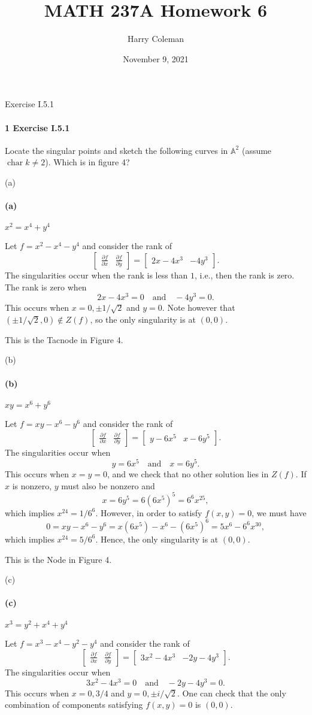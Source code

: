 \documentclass[12pt]{article}
\renewcommand{\maketitle}{\thispagestyle{title}}
\newlength{\myparskip}
\newenvironment{fullbox}{\begin{lrbox}{\savefullbox}\begin{minipage}{\dimexpr\textwidth-2\fboxsep\relax}\setlength{\parskip}{\myparskip}}{\end{minipage}\end{lrbox}\framebox[\textwidth]{\usebox{\savefullbox}}}
\newenvironment{pbox}[1][]{\begin{fullbox}\ifx#1\empty\else\paragraph{#1}\fi}{\end{fullbox}}
\newcommand{\isp}[1]{\quad\text{#1}\quad}
\newcommand{\<}{\langle}
\renewcommand{\>}{\rangle}
\newcommand{\A}{\mathbb{A}}
\newcommand{\mat}[1]{\begin{bmatrix}#1\end{bmatrix}}
\newcommand{\pdv}[2]{\frac{\partial #1}{\partial #2}}
\begin{document}
\title{MATH 237A Homework 6}
\author{Harry Coleman}
\date{November 9, 2021}
\maketitle

\begin{pbox}[1 Exercise I.5.1]
    Locate the singular points and sketch the following curves in $\A^2$ (assume $\operatorname{char} k \ne 2$). Which is in figure 4?
\end{pbox}

\begin{pbox}[(a)]
    $x^2 = x^4 + y^4$
\end{pbox}

Let $f = x^2 - x^4 - y^4$ and consider the rank of
\[
    \mat{\pdv{f}{x} & \pdv{f}{y}} = \mat{2x - 4x^3 & -4y^3}.
\]
The singularities occur when the rank is less than $1$, i.e., then the rank is zero. The rank is zero when
\[
    2x - 4x^3 = 0 \isp{and} -4y^3 = 0.
\]
This occurs when $x = 0, \pm1/\sqrt{2}$ and $y = 0$. Note however that $(\pm1/\sqrt{2}, 0) \notin Z(f)$, so the only singularity is at $(0, 0)$.

This is the Tacnode in Figure 4.

\begin{pbox}[(b)]
    $xy = x^6 + y^6$
\end{pbox}

Let $f = xy - x^6 - y^6$ and consider the rank of
\[
    \mat{\pdv{f}{x} & \pdv{f}{y}} = \mat{y - 6x^5 & x - 6y^5}.
\]
The singularities occur when
\[
    y = 6x^5 \isp{and} x = 6y^5.
\]
This occurs when $x = y = 0$, and we check that no other solution lies in $Z(f)$. If $x$ is nonzero, $y$ must also be nonzero and
\[
    x = 6y^5 = 6(6x^5)^5 = 6^6x^{25},
\]
which implies $x^{24} = 1/6^6$. However, in order to satisfy $f(x, y) = 0$, we must have
\[
    0 = xy - x^6 - y^6 = x(6x^5) - x^6 - (6x^5)^6 = 5x^6 - 6^6 x^{30},
\]
which implies $x^{24} = 5/6^6$. Hence, the only singularity is at $(0, 0)$.

This is the Node in Figure 4.


\newpage
\begin{pbox}[(c)]
    $x^3 = y^2 + x^4 + y^4$
\end{pbox}

Let $f = x^3 - x^4 - y^2 - y^4$ and consider the rank of
\[
    \mat{\pdv{f}{x} & \pdv{f}{y}} = \mat{3x^2 - 4x^3 & -2y - 4y^3}.
\]
The singularities occur when
\[
    3x^2 - 4x^3 = 0 \isp{and} -2y - 4y^3 = 0.
\]
This occurs when $x = 0, 3/4$ and $y = 0, \pm i/\sqrt{2}$. One can check that the only combination of components satisfying $f(x, y) = 0$ is $(0, 0)$.
\end{document}
